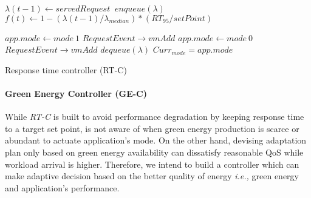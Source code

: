 \begin{algorithm} [!ht]
\DontPrintSemicolon
\footnotesize
{} 

\BlankLine 

     {    $\lambda(t-1)\gets servedRequest \ $ \;
         $enqueue(\lambda)$ \;
         $f(t)\gets 1-(\lambda(t-1)/\lambda_{median})*(RT_{95}/setPoint)$
	  
	   
			     { $app.mode\gets mode \ 1$\;
			     $RequestEvent \rightarrow vmAdd$  \;}
			{ $app.mode\gets mode \ 0$ \;
			$RequestEvent \rightarrow vmAdd$  \;}
                $dequeue(\lambda)$ \; 
                $Curr_{mode} = app.mode$ \;			
 			
 			    							 							
 		}
\caption {Response time controller (RT-C)} 
\label{algo:rt_extended}
\end{algorithm}
 



\paragraph*{\textbf{Green Energy Controller (GE-C)}} While \emph{RT-C} is built to avoid performance degradation by keeping
response time to a target set point, is not aware of when green energy production is scarce or abundant to actuate application's mode. On the other hand, devising adaptation plan only based on green energy availability can dissatisfy reasonable QoS while workload arrival is higher.
Therefore, we intend to build a controller which can make adaptive decision based on the better quality of energy \emph{i.e.,} green energy and application's performance. 

